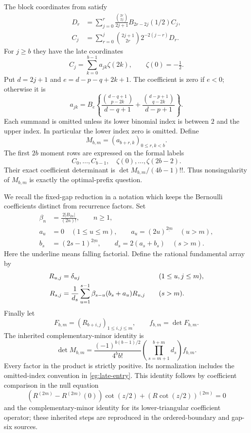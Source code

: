 The block coordinates from \cite{OrderedIncoming,GapSix} satisfy
\begin{align}
 D_r&=\sum_{j=0}^r\frac{\binom{2r}{2j}}{2j+1}
             B_{2r-2j}(1/2)C_j,\label{eg:forward}\\
 C_j&=\sum_{r=0}^j\binom{2j+1}{2r}2^{-2(j-r)}D_r.
 \label{eg:inverse}
\end{align}
For $j\ge b$ they have the late coordinates
\[
 C_j=\sum_{k=0}^{b-1}a_{jk}\zeta(2k),\qquad \zeta(0)=-\tfrac12.
\]
Put $d=2j+1$ and $e=d-p-q+2k+1$.  The coefficient is zero
if $e<0$; otherwise it is
\begin{equation}\label{eg:late-entry}
 a_{jk}=B_e\left\{
       \frac{\binom{d-q+1}{p-2k}}{d-q+1}
      +\frac{\binom{d-p+1}{q-2k}}{d-p+1}\right\}.
\end{equation}
Each summand is omitted unless its lower binomial index is between
$2$ and the upper index.  In particular the lower index zero is
omitted.  Define
\[
 M_{b,m}=(a_{b+r,k})_{0\le r,k<b}.
\]
The first $2b$ moment rows are expressed on the formal labels
\[
 C_0,\ldots,C_{b-1},\quad\zeta(0),\ldots,\zeta(2b-2).
\]
Their exact coefficient determinant is $\det M_{b,m}/(4b-1)!!$.
Thus nonsingularity of $M_{b,m}$ is exactly the optimal-prefix question.

We recall the fixed-gap reduction in a notation which keeps the
Bernoulli coefficients distinct from recurrence factors.  Set
\begin{align*}
 \beta_n&=\frac{2|B_{2n}|}{(2n)!},\qquad n\ge1,\\
 a_u&=0\quad(1\le u\le m),\qquad
 a_u=(2u)^{\underline{2m}}\quad(u>m),\\
 b_s&=(2s-1)^{\underline{2m}},\qquad
 d_s=2(a_s+b_s)\quad(s>m).
\end{align*}
Here the underline means falling factorial.  Define the rational
fundamental array by
\begin{align}
 R_{u,j}&=\delta_{uj}&&(1\le u,j\le m),\notag\\
 R_{s,j}&=\frac1{d_s}\sum_{u=1}^{s-1}
      \beta_{s-u}(b_s+a_u)R_{u,j}\quad&&(s>m).
 \label{eg:recurrence}
\end{align}
Finally let
\[
 F_{b,m}=(R_{b+i,j})_{1\le i,j\le m},\qquad f_{b,m}=\det F_{b,m}.
\]
The inherited complementary-minor identity is
\begin{equation}\label{eg:rational-bridge}
 \det M_{b,m}=
 \frac{(-1)^{b(b-1)/2}}{4^bb!}
       \left(\prod_{s=m+1}^{b+m}d_s\right) f_{b,m}.
\end{equation}
Every factor in the product is strictly positive.  Its normalization
includes the omitted-index convention in \eqref{eg:late-entry}.
This identity follows by coefficient comparison in the null equation
\[
 (R^{(2m)}-R^{(2m)}(0))\cot(z/2)
                         +(R\cot(z/2))^{(2m)}=0
\]
and the complementary-minor identity for its lower-triangular
coefficient operator; these inherited steps are reproduced in the
ordered-boundary and gap-six sources.

